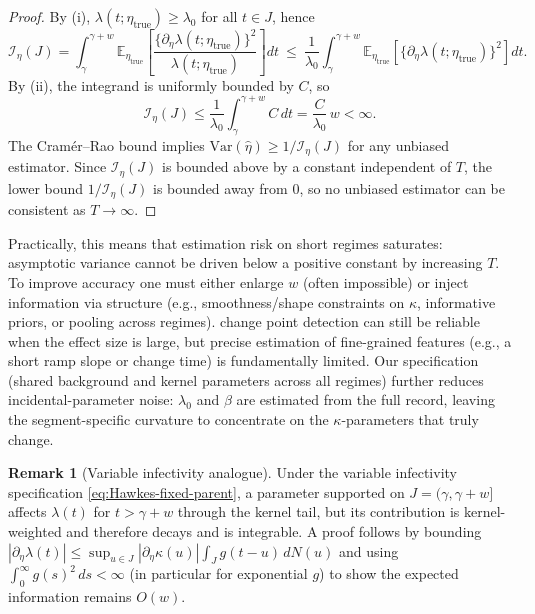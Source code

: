 \documentclass{article}
\theoremstyle{plain}
\theoremstyle{definition}
\newtheorem{remark}[theorem]{Remark}
\newcommand{\E}{\mathbb{E}}
\newcommand{\Var}{\mathrm{Var}}
\newcommand{\1}{\mathbf{1}}
\begin{document}
\begin{proof}
By (i), $\lambda(t;\eta_{\mathrm{true}})\ge \lambda_0$ for all $t\in J$, hence
\[
\mathcal I_\eta(J)
=\int_{\gamma}^{\gamma+w}\E_{\eta_{\mathrm{true}}}\!\left[\frac{\{\partial_\eta \lambda(t;\eta_{\mathrm{true}})\}^2}{\lambda(t;\eta_{\mathrm{true}})}\right]dt
\ \le\ \frac{1}{\lambda_0}\int_{\gamma}^{\gamma+w}\E_{\eta_{\mathrm{true}}}\!\left[\{\partial_\eta \lambda(t;\eta_{\mathrm{true}})\}^2\right]dt.
\]
By (ii), the integrand is uniformly bounded by $C$, so
\[
\mathcal I_\eta(J)\le \frac{1}{\lambda_0}\int_{\gamma}^{\gamma+w} C\,dt
=\frac{C}{\lambda_0}\,w
<\infty.
\]
The Cram\'er--Rao bound implies $\Var(\widehat\eta)\ge 1/\mathcal I_\eta(J)$ for any unbiased estimator. Since $\mathcal I_\eta(J)$ is bounded above by a constant independent of $T$, the lower bound $1/\mathcal I_\eta(J)$ is bounded away from $0$, so no unbiased estimator can be consistent as $T\to\infty$.
\end{proof}
    
    Practically, this means that estimation risk on short regimes saturates: asymptotic variance cannot be driven below a positive constant by increasing $T$. To improve accuracy one must either enlarge $w$ (often impossible) or inject information via structure (e.g., smoothness/shape constraints on $\kappa$, informative priors, or pooling across regimes). change point detection can still be reliable when the effect size is large, but precise estimation of fine-grained features (e.g., a short ramp slope or change time) is fundamentally limited. Our specification (shared background and kernel parameters across all regimes) further reduces incidental-parameter noise: $\lambda_0$ and $\beta$ are estimated from the full record, leaving the segment-specific curvature to concentrate on the $\kappa$-parameters that truly change.

    \begin{remark}[Variable infectivity analogue]
    Under the variable infectivity specification \eqref{eq:Hawkes-fixed-parent}, a parameter supported on $J=(\gamma,\gamma+w]$ affects $\lambda(t)$ for $t>\gamma+w$ through the kernel tail, but its contribution is kernel-weighted and therefore decays and is integrable. A proof follows by bounding $|\partial_\eta\lambda(t)| \le \sup_{u\in J}|\partial_\eta\kappa(u)|\int_J g(t-u)\,dN(u)$ and using $\int_0^\infty g(s)^2\,ds<\infty$ (in particular for exponential $g$) to show the expected information remains $O(w)$.
    \end{remark}
    
\end{document}

